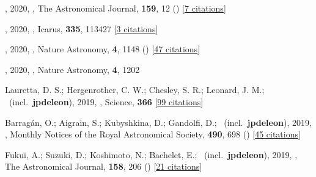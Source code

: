 \item[{\color{numcolor}\scriptsize113}] , 2020, , The Astronomical Journal, \textbf{159}, 12 () [\href{https://ui.adsabs.harvard.edu/abs/2020AJ....159...12M}{7 citations}]

\item[{\color{numcolor}\scriptsize112}] , 2020, , Icarus, \textbf{335}, 113427 [\href{https://ui.adsabs.harvard.edu/abs/2020Icar..33513427A}{3 citations}]

\item[{\color{numcolor}\scriptsize111}] , 2020, , Nature Astronomy, \textbf{4}, 1148 () [\href{https://ui.adsabs.harvard.edu/abs/2020NatAs...4.1148J}{47 citations}]

\item[{\color{numcolor}\scriptsize110}] , 2020, , Nature Astronomy, \textbf{4}, 1202

\item[{\color{numcolor}\scriptsize109}] Lauretta, D. S.; Hergenrother, C. W.; Chesley, S. R.; Leonard, J. M.; \etal\ (incl.\ \textbf{jpdeleon}), 2019, , Science, \textbf{366} [\href{https://ui.adsabs.harvard.edu/abs/2019Sci...366.3544L}{99 citations}]

\item[{\color{numcolor}\scriptsize108}] Barrag{\'a}n, O.; Aigrain, S.; Kubyshkina, D.; Gandolfi, D.; \etal\ (incl.\ \textbf{jpdeleon}), 2019, , Monthly Notices of the Royal Astronomical Society, \textbf{490}, 698 () [\href{https://ui.adsabs.harvard.edu/abs/2019MNRAS.490..698B}{45 citations}]

\item[{\color{numcolor}\scriptsize107}] Fukui, A.; Suzuki, D.; Koshimoto, N.; Bachelet, E.; \etal\ (incl.\ \textbf{jpdeleon}), 2019, , The Astronomical Journal, \textbf{158}, 206 () [\href{https://ui.adsabs.harvard.edu/abs/2019AJ....158..206F}{21 citations}]


